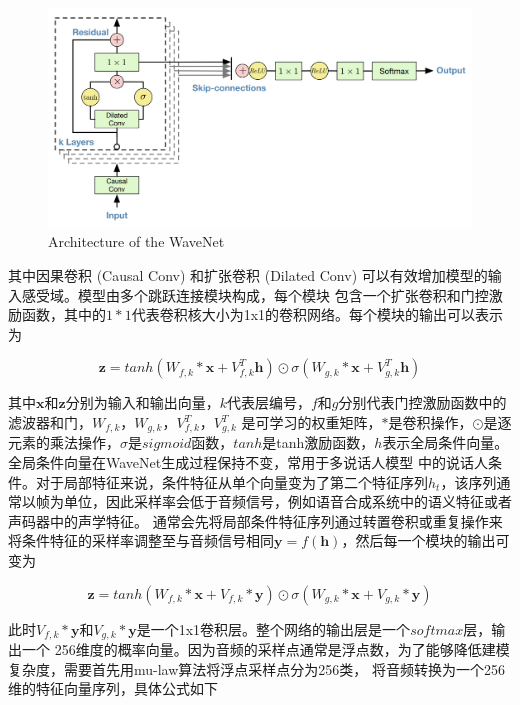\begin{figure}[!htp]
    \centering
    \includegraphics[width=12cm,trim=0 10 0 0,clip]{figure/4_wavenet.png}
    {Architecture of the WaveNet}
    \label{fig:wavenetarch}
\end{figure}

其中因果卷积 (Causal Conv) 和扩张卷积 (Dilated Conv) 可以有效增加模型的输入感受域。模型由多个跳跃连接模块构成，每个模块
包含一个扩张卷积和门控激励函数，其中的$1*1$代表卷积核大小为1x1的卷积网络。每个模块的输出可以表示为

\begin{equation}
    \mathbf{z} = tanh(W_{f,k} * \mathbf{x} + V^{T}_{f,k}\mathbf{h})\odot \sigma(W_{g,k} * \mathbf{x} + V^{T}_{g,k}\mathbf{h})
\end{equation}

其中$\mathbf{x}$和$\mathbf{z}$分别为输入和输出向量，$k$代表层编号，$f$和$g$分别代表门控激励函数中的滤波器和门，$W_{f,k}$，$W_{g,k}$，$V^T_{f,k}$，$V^T_{g,k}$
是可学习的权重矩阵，$*$是卷积操作，$\odot$是逐元素的乘法操作，$\sigma$是$sigmoid$函数，$tanh$是tanh激励函数，$h$表示全局条件向量。全局条件向量在WaveNet生成过程保持不变，常用于多说话人模型
中的说话人条件。对于局部特征来说，条件特征从单个向量变为了第二个特征序列$h_t$，该序列通常以帧为单位，因此采样率会低于音频信号，例如语音合成系统中的语义特征或者声码器中的声学特征。
通常会先将局部条件特征序列通过转置卷积或重复操作来将条件特征的采样率调整至与音频信号相同$\mathbf{y} = f(\mathbf{h})$，然后每一个模块的输出可变为

\begin{equation}
    \mathbf{z} = tanh(W_{f,k} * \mathbf{x} + V_{f,k} * \mathbf{y}) \odot \sigma (W_{g,k} * \mathbf{x} + V_{g,k} * \mathbf{y})
\end{equation}

此时$V_{f,k} * \mathbf{y}$和$V_{g,k} * \mathbf{y}$是一个1x1卷积层。整个网络的输出层是一个$softmax$层，输出一个
256维度的概率向量。因为音频的采样点通常是浮点数，为了能够降低建模复杂度，需要首先用mu-law算法将浮点采样点分为256类，
将音频转换为一个256维的特征向量序列，具体公式如下

